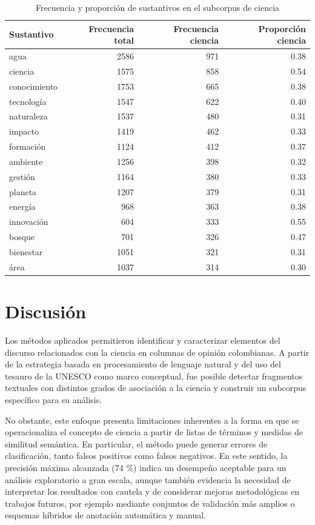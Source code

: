 \documentclass[11pt,a4paper]{article}
\begin{document}
\begin{table}[H]
	\centering
	\begin{tabular}{lrrr}
		\toprule
		\textbf{Sustantivo} & \textbf{Frecuencia total} & \textbf{Frecuencia ciencia} & \textbf{Proporción ciencia} \\
		\midrule
		agua          & 2586 & 971 & 0.38 \\
		ciencia       & 1575 & 858 & 0.54 \\
		conocimiento  & 1753 & 665 & 0.38 \\
		tecnología    & 1547 & 622 & 0.40 \\
		naturaleza    & 1537 & 480 & 0.31 \\
		impacto       & 1419 & 462 & 0.33 \\
		formación     & 1124 & 412 & 0.37 \\
		ambiente      & 1256 & 398 & 0.32 \\
		gestión       & 1164 & 380 & 0.33 \\
		planeta       & 1207 & 379 & 0.31 \\
		energía       & 968  & 363 & 0.38 \\
		innovación    & 604  & 333 & 0.55 \\
		bosque        & 701  & 326 & 0.47 \\
		bienestar     & 1051 & 321 & 0.31 \\
		área          & 1037 & 314 & 0.30 \\
		\bottomrule
	\end{tabular}
	\caption{Frecuencia y proporción de sustantivos en el subcorpus de ciencia}
	\label{tab:sustantivos_ciencia}
\end{table}

	
	\section{Discusión}
	
Los métodos aplicados permitieron identificar y caracterizar elementos del discurso relacionados con la ciencia en columnas de opinión colombianas. A partir de la estrategia basada en procesamiento de lenguaje natural y del uso del tesauro de la UNESCO como marco conceptual, fue posible detectar fragmentos textuales con distintos grados de asociación a la ciencia y construir un subcorpus específico para su análisis.

No obstante, este enfoque presenta limitaciones inherentes a la forma en que se operacionaliza el concepto de ciencia a partir de listas de términos y medidas de similitud semántica. En particular, el método puede generar errores de clasificación, tanto falsos positivos como falsos negativos. En este sentido, la precisión máxima alcanzada (74 \%) indica un desempeño aceptable para un análisis exploratorio a gran escala, aunque también evidencia la necesidad de interpretar los resultados con cautela y de considerar mejoras metodológicas en trabajos futuros, por ejemplo mediante conjuntos de validación más amplios o esquemas híbridos de anotación automática y manual.
\end{document}
